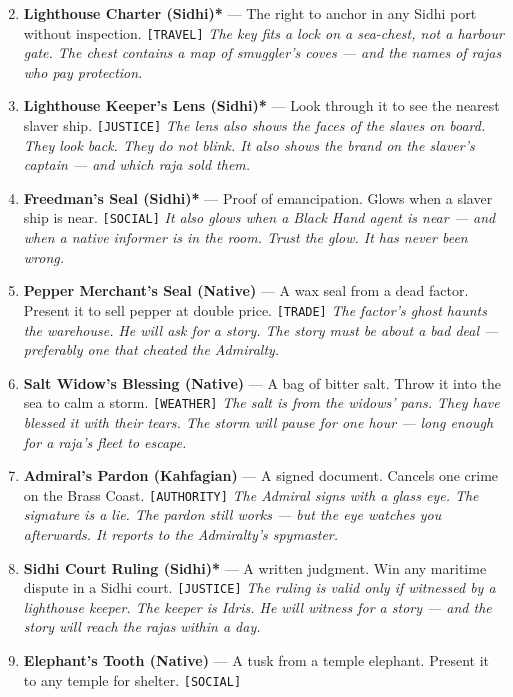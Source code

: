 \begin{enumerate}
\setcounter{enumi}{1}
\item \textbf{Lighthouse Charter (Sidhi)*} --- The right to anchor in any Sidhi port without inspection. \texttt{[TRAVEL]}
  \hfill \textit{The key fits a lock on a sea-chest, not a harbour gate. The chest contains a map of smuggler's coves --- and the names of rajas who pay protection.}
\item \textbf{Lighthouse Keeper's Lens (Sidhi)*} --- Look through it to see the nearest slaver ship. \texttt{[JUSTICE]}
  \hfill \textit{The lens also shows the faces of the slaves on board. They look back. They do not blink. It also shows the brand on the slaver's captain --- and which raja sold them.}
\item \textbf{Freedman's Seal (Sidhi)*} --- Proof of emancipation. Glows when a slaver ship is near. \texttt{[SOCIAL]}
  \hfill \textit{It also glows when a Black Hand agent is near --- and when a native informer is in the room. Trust the glow. It has never been wrong.}
\item \textbf{Pepper Merchant's Seal (Native)\textdagger} --- A wax seal from a dead factor. Present it to sell pepper at double price. \texttt{[TRADE]}
  \hfill \textit{The factor's ghost haunts the warehouse. He will ask for a story. The story must be about a bad deal --- preferably one that cheated the Admiralty.}
\item \textbf{Salt Widow's Blessing (Native)\textdagger} --- A bag of bitter salt. Throw it into the sea to calm a storm. \texttt{[WEATHER]}
  \hfill \textit{The salt is from the widows' pans. They have blessed it with their tears. The storm will pause for one hour --- long enough for a raja's fleet to escape.}
\item \textbf{Admiral's Pardon (Kahfagian)\textdaggerdbl} --- A signed document. Cancels one crime on the Brass Coast. \texttt{[AUTHORITY]}
  \hfill \textit{The Admiral signs with a glass eye. The signature is a lie. The pardon still works --- but the eye watches you afterwards. It reports to the Admiralty's spymaster.}
\item \textbf{Sidhi Court Ruling (Sidhi)*} --- A written judgment. Win any maritime dispute in a Sidhi court. \texttt{[JUSTICE]}
  \hfill \textit{The ruling is valid only if witnessed by a lighthouse keeper. The keeper is Idris. He will witness for a story --- and the story will reach the rajas within a day.}
\item \textbf{Elephant's Tooth (Native)\textdagger} --- A tusk from a temple elephant. Present it to any temple for shelter. \texttt{[SOCIAL]}

\end{enumerate}
